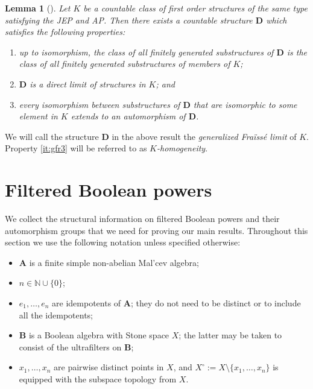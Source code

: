 \documentclass[12pt,a4paper,reqno]{amsart}
\numberwithin{equation}{section}
\theoremstyle{plain}
\newtheorem{lem}[thm]{Lemma}
\theoremstyle{definition}
\newcommand{\A}{\mathbf{A}}
\newcommand{\B}{\mathbf{B}}
\newcommand{\D}{\mathbf{D}}
\newcommand{\N}{\mathbb{N}}
\begin{document}
\begin{lem}[{\protect\cite[Exercise 7.1.11]{Ho:MT}}]
\label{la:genFr}
Let $K$ be a countable class of first order structures of the same type satisfying the JEP and AP.
Then there exists a countable structure $\D$ which satisfies the following properties: 
\begin{enumerate}
\item\label{it:gfr1}
up to isomorphism, the class of all finitely generated substructures of $\D$ is the class of all finitely generated substructures of members of $K$;
 \item\label{it:gfr2}
 $\mathbf{D}$ is a direct limit of structures in $K$; and
 \item\label{it:gfr3}
 every isomorphism between substructures of $\mathbf{D}$ that are isomorphic to some element in $K$ extends
 to an automorphism of $\mathbf{D}$.
 \end{enumerate}
 \end{lem}
 
 We will call the structure $\D$ in the above result the \emph{generalized Fra{\"i}ss{\'e} limit} of $K$.
 Property \eqref{it:gfr3} will be referred to as \emph{$K$-homogeneity}.
 
  









\section{Filtered Boolean powers} \label{sec:Booleanpowers}

We collect the structural information on filtered Boolean powers and their automorphism groups that we need for
proving our main results.
 Throughout this section we use the following notation unless specified otherwise:
\begin{itemize}
\item $\A$ is a finite simple non-abelian Mal'cev algebra;
\item $n\in\N\cup\{0\}$;
\item $e_1,\dots,e_n$ are idempotents of $\A$; they do not need to be distinct or to include all the idempotents;
\item
  $\B$ is a Boolean algebra with Stone space $X$; the latter may be taken to consist of the ultrafilters on $\B$;
 \item
$x_1,\dots,x_n$ are pairwise distinct points in $X$, and 
 $X^\circ := X\setminus\{x_1,\dots,x_n\}$ is equipped with the subspace topology from $X$.
\end{itemize}
\end{document}
